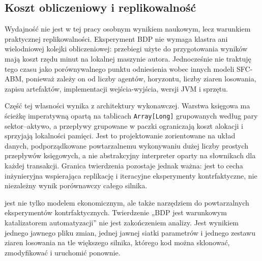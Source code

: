 \subsection{Koszt obliczeniowy i replikowalność}

Wydajność nie jest w tej pracy osobnym wynikiem naukowym, lecz warunkiem praktycznej replikowalności. Eksperyment BDP nie wymaga klastra ani wielodniowej kolejki obliczeniowej: przebiegi użyte do przygotowania wyników mają koszt rzędu minut na lokalnej maszynie autora. Jednocześnie nie traktuję tego czasu jako porównywalnego punktu odniesienia wobec innych modeli SFC-ABM, ponieważ zależy on od liczby agentów, horyzontu, liczby ziaren losowania, zapisu artefaktów, implementacji wejścia-wyjścia, wersji JVM i sprzętu.

Część tej własności wynika z architektury wykonawczej. Warstwa księgowa ma ścieżkę imperatywną opartą na tablicach \texttt{Array[Long]} grupowanych według pary sektor--aktywo, a przepływy grupowane w paczki ograniczają koszt alokacji i sprzyjają lokalności pamięci. Jest to projektowanie zorientowane na układ danych, podporządkowane powtarzalnemu wykonywaniu dużej liczby prostych przepływów księgowych, a nie abstrakcyjny interpreter oparty na słownikach dla każdej transakcji. Granica twierdzenia pozostaje jednak ważna: jest to cecha inżynieryjna wspierająca replikację i iteracyjne eksperymenty kontrfaktyczne, nie niezależny wynik porównawczy całego silnika.

\amor{} jest nie tylko modelem ekonomicznym, ale także narzędziem do powtarzalnych eksperymentów kontrfaktycznych. Twierdzenie „BDP jest warunkowym katalizatorem automatyzacji” nie jest zakończeniem analizy. Jest wynikiem jednego jawnego pliku zmian, jednej jawnej siatki parametrów i jednego zestawu ziaren losowania na tle większego silnika, którego kod można sklonować, zmodyfikować i uruchomić ponownie.

